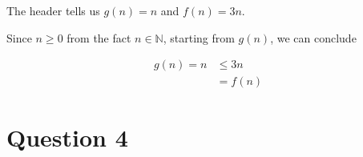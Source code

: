 \documentclass[12pt]{article}
\begin{document}
\begin{enumerate}[a.]
\begin{mdframed}
        \bigskip

        The header tells us $g(n) = n$ and $f(n) = 3n$.

        \bigskip

        \color{red}Since $n \geq 0$ from the fact $n \in \mathbb{N}$\color{black},
        starting from $g(n)$, we can conclude

        \setcounter{equation}{0}
        \begin{align}
            g(n) = n &\leq 3n\\
            &= f(n)
        \end{align}


    \end{mdframed}

\end{enumerate}

\section*{Question 4}
\end{document}
